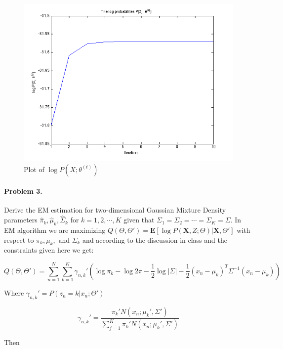 \documentclass[a4paper]{article}
\begin{document}
\begin{figure}[H]
  \centering
    \includegraphics[scale=.57]{images/log_P_X.png}
  \caption{Plot of $\log P(X; \theta^{(t)})$}
  \label{fig:log_P_X}
\end{figure}

\paragraph{Problem 3.} Derive the EM estimation for two-dimensional Gaussian Mixture Density parameters $\hat{\pi}_k, \hat{\mu}_k, \hat{\Sigma}_k$ for $k = 1,2,\cdots,K$ given that $\Sigma_1 = \Sigma_2 = \cdots = \Sigma_K = \Sigma$. In EM algorithm we are maximizing $Q(\Theta, \Theta') = \mathbf{E} [ \log P(\mathbf{X}, Z; \Theta) | \mathbf{X}, \Theta']$ with respect to $\pi_k, \mu_k, \text{ and } \Sigma_k$ and according to the discussion in class and the constraints given here we get:

\begin{equation}
	Q(\Theta, \Theta') = \sum_{n=1}^N \sum_{k=1}^K \gamma_{n,k}' \left( \log \pi_k - \log 2\pi - \frac{1}{2}\log |\Sigma| - \frac{1}{2}(x_n-\mu_k)^T\Sigma^{-1}(x_n-\mu_k) \right)
\end{equation}

Where $\gamma_{n,k}' = P(z_n=k|x_n; \Theta')$

\begin{equation}
	\gamma_{n,k}' = \frac{\pi_k'N(x_n;\mu_k', \Sigma')}{\sum_{j=1}^K \pi_k'N(x_n;\mu_k', \Sigma')}
\end{equation}	

Then
\end{document}
